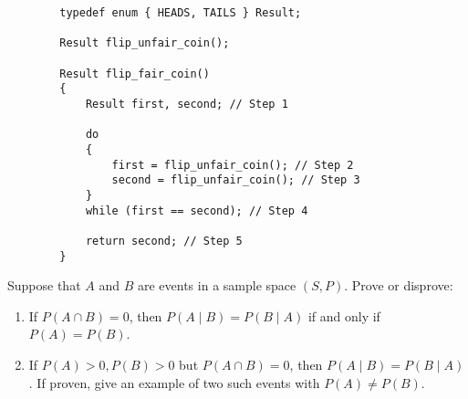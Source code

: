 \documentclass{article}
\theoremstyle{definition}
\begin{document}
\begin{lstlisting}
        typedef enum { HEADS, TAILS } Result;
        
        Result flip_unfair_coin();
        
        Result flip_fair_coin()
        {
            Result first, second; // Step 1
        
            do
            {
                first = flip_unfair_coin(); // Step 2
                second = flip_unfair_coin(); // Step 3
            }
            while (first == second); // Step 4
            
            return second; // Step 5
        }
\end{lstlisting}
\begin{question}
    Suppose that $A$ and $B$ are events in a sample space $(S,P)$.
    Prove or disprove:
    \begin{enumerate}
        \item If $P(A \cap B)=0$, then $P(A\mid B)=P(B\mid A)$ if and only
            if $P(A)=P(B)$.
        \item If $P(A)>0, P(B)>0$ but $P(A \cap B)=0$, then $P(A\mid
            B)=P(B\mid A)$.  If proven, give an example of two such events
            with $P(A) \ne P(B)$.
    \end{enumerate}
\end{question}
\end{document}
